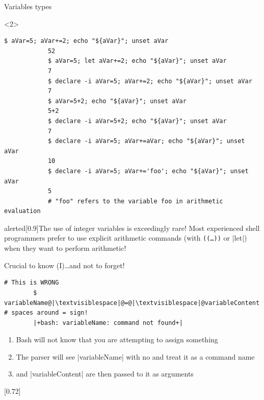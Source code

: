 \begin{frame}[fragile]{Variables types}
    \begin{onlyenv}<2>
        \begin{lstlisting}[style=MyBash, style=oddnumbers, belowskip=-5mm, xrightmargin=5mm, xleftmargin=5mm]
            $ aVar=5; aVar+=2; echo "${aVar}"; unset aVar
            52
            $ aVar=5; let aVar+=2; echo "${aVar}"; unset aVar
            7
            $ declare -i aVar=5; aVar+=2; echo "${aVar}"; unset aVar
            7
            $ aVar=5+2; echo "${aVar}"; unset aVar
            5+2
            $ declare -i aVar=5+2; echo "${aVar}"; unset aVar
            7
            $ declare -i aVar=5; aVar+=aVar; echo "${aVar}"; unset aVar
            10
            $ declare -i aVar=5; aVar+='foo'; echo "${aVar}"; unset aVar
            5
            # "foo" refers to the variable foo in arithmetic evaluation
        \end{lstlisting}
        \begin{varblock}{alerted}[0.9\textwidth]{The use of integer variables is exceedingly rare!}
            Most experienced shell programmers prefer to use explicit arithmetic commands (with \texttt{((\ldots))} or \bash|let|) when they want to perform arithmetic!
        \end{varblock}
    \end{onlyenv}
\end{frame}
\begin{frame}[fragile]{Crucial to know (I)}{\ldots{}and not to forget!}
    \begin{lstlisting}[style=MyBash, numbers=none]
        # This is WRONG
        $ variableName@|\textvisiblespace|@=@|\textvisiblespace|@variableContent   # spaces around = sign!
        |+bash: variableName: command not found+|
    \end{lstlisting}
    \bigskip
    \begin{enumerate}
        \item Bash will not know that you are attempting to assign something
        \item The parser will see \bash|variableName| with no \bash{=} and treat it as a command name
        \item \bash{=} and \bash|variableContent| are then passed to it as arguments
    \end{enumerate}
    \bigskip
    \begin{varblock}{}[0.72\textwidth]{}
        \Large{}
    \end{varblock}
\end{frame}
